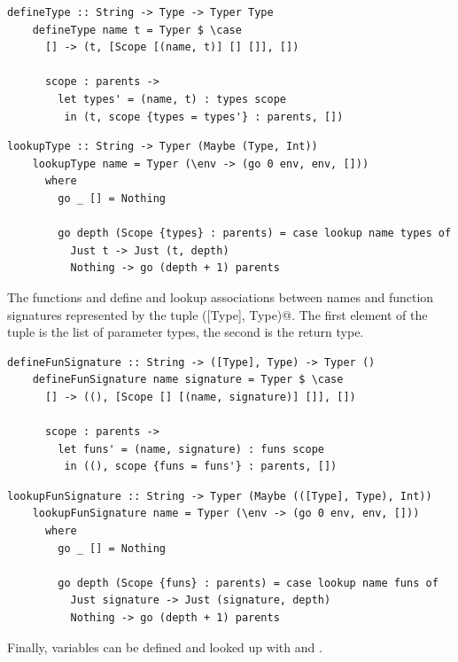\documentclass[UdineBachThesis,american,11pt,draft]{PhdThesis}
\begin{document}
  \begin{lstlisting}[gobble=4,basicstyle=\ttfamily\small]
    defineType :: String -> Type -> Typer Type
    defineType name t = Typer $ \case
      [] -> (t, [Scope [(name, t)] [] []], [])

      scope : parents ->
        let types' = (name, t) : types scope
         in (t, scope {types = types'} : parents, [])
  \end{lstlisting}

  \begin{lstlisting}[gobble=4,basicstyle=\ttfamily\small]
    lookupType :: String -> Typer (Maybe (Type, Int))
    lookupType name = Typer (\env -> (go 0 env, env, []))
      where
        go _ [] = Nothing

        go depth (Scope {types} : parents) = case lookup name types of
          Just t -> Just (t, depth)
          Nothing -> go (depth + 1) parents
  \end{lstlisting}

  The functions \lstinline@defineFunSignature@ and
  \lstinline@lookupFunSignature@ define and lookup associations between names
  and function signatures represented by the tuple \lstinline@([Type], Type)@.
  The first element of the tuple is the list of parameter types, the second is
  the return type.

  \begin{lstlisting}[gobble=4,basicstyle=\ttfamily\small]
    defineFunSignature :: String -> ([Type], Type) -> Typer ()
    defineFunSignature name signature = Typer $ \case
      [] -> ((), [Scope [] [(name, signature)] []], [])

      scope : parents ->
        let funs' = (name, signature) : funs scope
         in ((), scope {funs = funs'} : parents, [])
  \end{lstlisting}

  \begin{lstlisting}[gobble=4,basicstyle=\ttfamily\small]
    lookupFunSignature :: String -> Typer (Maybe (([Type], Type), Int))
    lookupFunSignature name = Typer (\env -> (go 0 env, env, []))
      where
        go _ [] = Nothing

        go depth (Scope {funs} : parents) = case lookup name funs of
          Just signature -> Just (signature, depth)
          Nothing -> go (depth + 1) parents
  \end{lstlisting}

  Finally, variables can be defined and looked up with \lstinline@defineVarType@
  and \lstinline@lookupVarType@.
\end{document}
